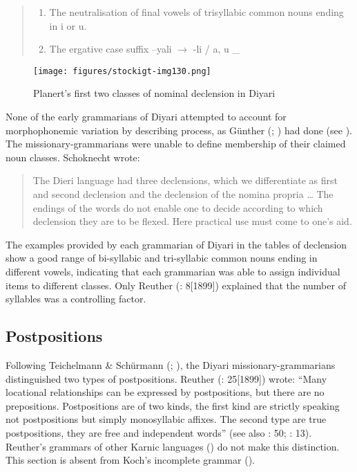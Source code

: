 \begin{quote}
\begin{enumerate}
	\item[] The neutralisation of final vowels of trisyllabic common nouns ending in i or u. \\
	\item[] The ergative case suffix –yali $\to$ -li  / a, u \_
\end{enumerate}
\end{quote}

\begin{figure}
\texttt{[image: figures/stockigt-img130.png]}
\caption{Planert's first two classes of nominal declension in Diyari \citeyearpar[690]{planert_australische_1908}}
\label{bkm:Ref449372014}\label{fig:key:8-181}
\end{figure}

None of the early grammarians of Diyari attempted to account for morphophonemic variation by describing process, as Günther (\citeyear{gunther_native_1838}; \citeyear{gunther_lecture_1840}) had done (see ). The missionary-grammarians were unable to define membership of their claimed noun classes. Schoknecht wrote:

\begin{quote}
The Dieri language had three declensions, which we differentiate as first and second declension and the declension of the nomina propria … The endings of the words do not enable one to decide according to which declension they are to be flexed. Here practical use must come to one’s aid. \citep[2]{schoknecht_grammar_1947}
\end{quote}

The examples provided by each grammarian of Diyari in the tables of declension show a good range of bi-syllabic and tri-syllabic common nouns ending in different vowels, indicating that each grammarian was able to assign individual items to different classes. Only Reuther (\citeyear{reuther_three_1981}: 8[1899]) explained that the number of syllables was a controlling factor.

\subsection{{Postpositions}}
\label{sec:key:8.7.1}\label{bkm:Ref456339501}\label{bkm:Ref457382655}
\largerpage[-1]
Following Teichelmann \& Schürmann (\citeyear{TeichelmannSchürmann1840}; ), the Diyari missionary-gram\-mar\-ians distinguished two types of postpositions. Reuther (\citeyear{reuther_three_1981}: 25[1899]) wrote: “Many locational relationships can be expressed by postpositions, but there are no prepositions. Postpositions are of two kinds, the first kind are strictly speaking not postpositions but simply monosyllabic affixes. The second type are true postpositions, they are free and independent words” (see also \citealt{flierl_christianieli_1880}: 50; \citealt{schoknecht_grammar_1947}: 13). Reuther’s grammars of other Karnic languages (\citeyear{reuther_ms_1901}) do not make this distinction. This section is absent from Koch’s incomplete grammar (\citeyear{koch_untitled_1868}).


